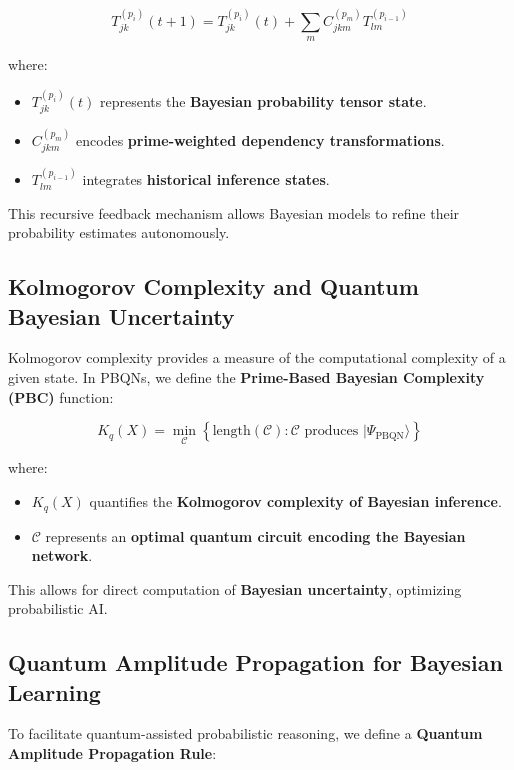 \documentclass{article}
\theoremstyle{plain}
\theoremstyle{plain}
\theoremstyle{definition}
\theoremstyle{remark}
\begin{document}
\begin{equation}
T_{jk}^{(p_i)}(t+1) = T_{jk}^{(p_i)}(t) + \sum_{m} C_{jkm}^{(p_m)} T_{lm}^{(p_{i-1})}
\end{equation}

where:
\begin{itemize}
    \item $T_{jk}^{(p_i)}(t)$ represents the \textbf{Bayesian probability tensor state}.
    \item $C_{jkm}^{(p_m)}$ encodes \textbf{prime-weighted dependency transformations}.
    \item $T_{lm}^{(p_{i-1})}$ integrates \textbf{historical inference states}.
\end{itemize}

This recursive feedback mechanism allows Bayesian models to refine their probability estimates autonomously.

\subsection{Kolmogorov Complexity and Quantum Bayesian Uncertainty}

Kolmogorov complexity provides a measure of the computational complexity of a given state. In PBQNs, we define the \textbf{Prime-Based Bayesian Complexity (PBC)} function:

\begin{equation}
K_q (X) = \min_{\mathcal{C}} \left\{ \text{length}(\mathcal{C}) : \mathcal{C} \text{ produces } |\Psi_{\text{PBQN}} \rangle \right\}
\end{equation}

where:
\begin{itemize}
    \item $K_q (X)$ quantifies the \textbf{Kolmogorov complexity of Bayesian inference}.
    \item $\mathcal{C}$ represents an \textbf{optimal quantum circuit encoding the Bayesian network}.
\end{itemize}

This allows for direct computation of \textbf{Bayesian uncertainty}, optimizing probabilistic AI.

\subsection{Quantum Amplitude Propagation for Bayesian Learning}

To facilitate quantum-assisted probabilistic reasoning, we define a \textbf{Quantum Amplitude Propagation Rule}:
\end{document}

